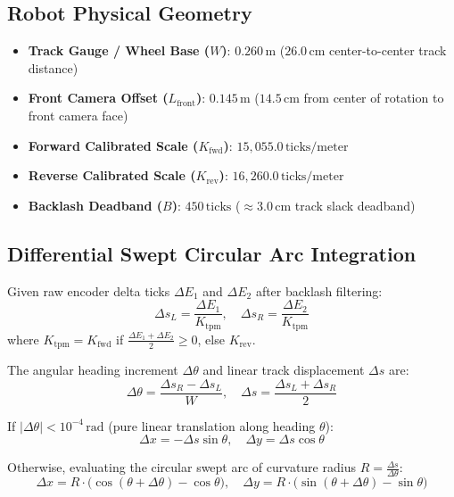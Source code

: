 \documentclass[11pt,a4paper]{article}
\begin{document}
\subsection{Robot Physical Geometry}
\begin{itemize}
    \item \textbf{Track Gauge / Wheel Base ($W$)}: $0.260\,\text{m}$ ($26.0\,\text{cm}$ center-to-center track distance)
    \item \textbf{Front Camera Offset ($L_{\text{front}}$)}: $0.145\,\text{m}$ ($14.5\,\text{cm}$ from center of rotation to front camera face)
    \item \textbf{Forward Calibrated Scale ($K_{\text{fwd}}$)}: $15,055.0\,\text{ticks/meter}$
    \item \textbf{Reverse Calibrated Scale ($K_{\text{rev}}$)}: $16,260.0\,\text{ticks/meter}$
    \item \textbf{Backlash Deadband ($B$)}: $450\,\text{ticks}$ ($\approx 3.0\,\text{cm}$ track slack deadband)
\end{itemize}

\subsection{Differential Swept Circular Arc Integration}
Given raw encoder delta ticks $\Delta E_1$ and $\Delta E_2$ after backlash filtering:
\begin{equation}
\Delta s_L = \frac{\Delta E_1}{K_{\text{tpm}}}, \quad \Delta s_R = \frac{\Delta E_2}{K_{\text{tpm}}}
\end{equation}
where $K_{\text{tpm}} = K_{\text{fwd}}$ if $\frac{\Delta E_1 + \Delta E_2}{2} \ge 0$, else $K_{\text{rev}}$.

The angular heading increment $\Delta \theta$ and linear track displacement $\Delta s$ are:
\begin{equation}
\Delta \theta = \frac{\Delta s_R - \Delta s_L}{W}, \quad \Delta s = \frac{\Delta s_L + \Delta s_R}{2}
\end{equation}

If $|\Delta \theta| < 10^{-4}\,\text{rad}$ (pure linear translation along heading $\theta$):
\begin{equation}
\Delta x = -\Delta s \sin\theta, \quad \Delta y = \Delta s \cos\theta
\end{equation}

Otherwise, evaluating the circular swept arc of curvature radius $R = \frac{\Delta s}{\Delta \theta}$:
\begin{equation}
\Delta x = R \cdot \big(\cos(\theta + \Delta \theta) - \cos\theta\big), \quad \Delta y = R \cdot \big(\sin(\theta + \Delta \theta) - \sin\theta\big)
\end{equation}
\end{document}
